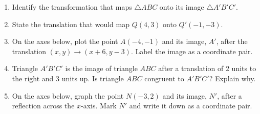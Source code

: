 \documentclass[12pt, twoside]{article}
\begin{document}
\begin{enumerate}
\newpage
\item Identify the transformation that maps $\triangle ABC$ onto its image $\triangle A'B'C'$.
\begin{flushright}
\end{flushright}

\item State the translation that would map $Q(4,3)$ onto $Q'(-1,-3)$. \vspace{1cm}

\item On the axes below, plot the point $A(-4,-1)$ and its image, $A'$, after the translation $(x,y) \rightarrow (x+6,y-3)$. Label the image as a coordinate pair.
  \begin{center}
\end{center}

\item Triangle $A'B'C'$ is the image of triangle $ABC$ after a translation of 2 units to the right and 3 units up. Is triangle $ABC$ congruent to $A'B'C'$? Explain why. \vspace{3cm}

\newpage
\item On the axes below, graph the point $N(-3,2)$ and its image, $N'$, after a reflection across the $x$-axis. Mark $N'$ and write it down as a coordinate pair.
  \begin{center}
\end{center}


\end{enumerate}
\end{document}
